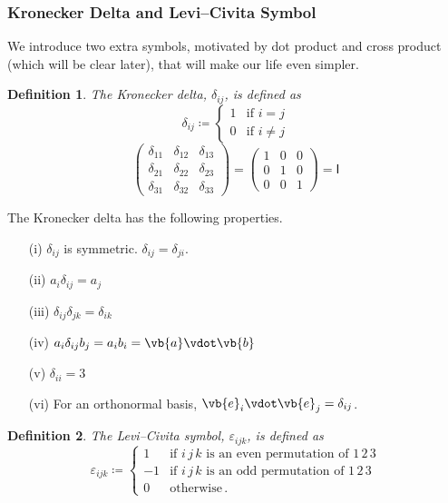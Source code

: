 \documentclass{article}
\theoremstyle{plain}\theoremheaderfont{\normalfont\itshape}\theorembodyfont{\rmfamily}\theoremseparator{.}\newtheorem*{rem}{Remark}\newtheorem*{ex}{Example}\newtheorem*{proof}{Proof}\newtheorem*{altp}{Alternative proof}
\theoremstyle{plain}\theoremheaderfont{\normalfont\bfseries}\theorembodyfont{\rmfamily}\theoremseparator{.}\newtheorem{thm}{Theorem}[section]\newtheorem{lem}[thm]{Lemma}\newtheorem{prop}[thm]{Proposition}\newtheorem*{cor}{Corollary}\newtheorem{defn}[thm]{Definition}\newtheorem{clm}[thm]{Claim}\newtheorem{clminproof}{Claim}
\theoremstyle{break}\theoremheaderfont{\normalfont\itshape}\theorembodyfont{\rmfamily}\theoremseparator{.\medskip}\newtheorem*{proofskip}{Proof}\newtheorem*{exs}{Examples}\newtheorem*{rems}{Remarks}
\theoremstyle{break}\theoremheaderfont{\normalfont\bfseries}\theorembodyfont{\rmfamily}\theoremseparator{.\medskip}\newtheorem{lemskip}[thm]{Lemma}\newtheorem{defnskip}[thm]{Definition}\newtheorem{propskip}[thm]{Proposition}\newtheorem{thmskip}[thm]{Theorem}
\numberwithin{equation}{section}
\begin{document}
	\subsubsection{Kronecker Delta and Levi--Civita Symbol}
	We introduce two extra symbols, motivated by dot product and cross product (which will be clear later), that will make our life even simpler.
	\begin{defn}
		The \textit{Kronecker delta}, \(\delta_{ij}\), is defined as
		\[\delta_{ij}\coloneqq\begin{cases}
			1 & \text{if }i=j\\
			0 & \text{if }i\ne j
		\end{cases}\]
		\[\begin{pmatrix}
			\delta_{11} & \delta_{12} &\delta_{13}\\
			\delta_{21} & \delta_{22} &\delta_{23}\\
			\delta_{31} & \delta_{32} &\delta_{33}
		\end{pmatrix}=\begin{pmatrix}
			1 & 0 & 0\\
			0 & 1 & 0\\
			0 & 0 & 1
		\end{pmatrix}
		=\mathsf{I}\]
	\end{defn}
	The Kronecker delta has the following properties.
	\begin{enumerate}[topsep=0pt,label=(\roman*)]
		\item[(i)] \(\delta_{ij}\) is symmetric. \(\delta_{ij}=\delta_{ji}\).
		\item[(ii)] \(a_{i}\delta_{ij}=a_{j}\)
		\item[(iii)] \(\delta_{ij}\delta_{jk}=\delta_{ik}\)
		\item[(iv)] \(a_i\delta_{ij}b_j=a_ib_i=\vb{a}\vdot\vb{b}\)
		\item[(v)] \(\delta_{ii}=3\)
		\item[(vi)] For an orthonormal basis, \(\vb{e}_i\vdot\vb{e}_j=\delta_{ij}\).
	\end{enumerate}

	\begin{defn}
		The \textit{Levi--Civita symbol}, \(\varepsilon_{ijk}\), is defined as
		\[\varepsilon_{ijk}\coloneqq\begin{cases}
			1 & \text{if }i\,j\,k\text{ is an even permutation of }1\,2\,3\\
			-1 & \text{if }i\,j\,k\text{ is an odd permutation of }1\,2\,3\\
			0 & \text{otherwise}\,.
		\end{cases}\]
	\end{defn}
	
\end{document}
